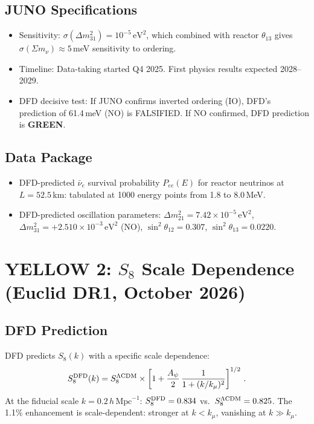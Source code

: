 \documentclass[11pt,a4paper]{article}
\newcommand{\GREEN}{\textcolor{dfdgreen}{\textbf{GREEN}}}
\begin{document}
\subsection{JUNO Specifications}
\begin{itemize}
\item Sensitivity: $\sigma(\Delta m^2_{31}) = 10^{-5}\,\mathrm{eV}^2$, which combined with reactor $\theta_{13}$ gives $\sigma(\Sigma m_\nu) \approx 5$\,meV sensitivity to ordering.
\item Timeline: Data-taking started Q4 2025. First physics results expected 2028--2029.
\item DFD decisive test: If JUNO confirms inverted ordering (IO), DFD's prediction of 61.4\,meV (NO) is FALSIFIED. If NO confirmed, DFD prediction is \GREEN.
\end{itemize}

\subsection{Data Package}
\begin{itemize}
\item DFD-predicted $\bar{\nu}_e$ survival probability $P_{ee}(E)$ for reactor neutrinos at $L = 52.5$\,km: tabulated at 1000 energy points from 1.8 to 8.0\,MeV.
\item DFD-predicted oscillation parameters: $\Delta m^2_{21} = 7.42 \times 10^{-5}\,\mathrm{eV}^2$, $\Delta m^2_{31} = +2.510 \times 10^{-3}\,\mathrm{eV}^2$ (NO), $\sin^2\theta_{12} = 0.307$, $\sin^2\theta_{13} = 0.0220$.
\end{itemize}

\section{YELLOW 2: $S_8$ Scale Dependence (Euclid DR1, October 2026)}

\subsection{DFD Prediction}
DFD predicts $S_8(k)$ with a specific scale dependence:
\begin{equation}
S_8^{\rm DFD}(k) = S_8^{\Lambda{\rm CDM}} \times \left[1 + \frac{A_\psi}{2}\,\frac{1}{1 + (k/k_\mu)^2}\right]^{1/2}\,.
\end{equation}
At the fiducial scale $k = 0.2\,h\,\mathrm{Mpc}^{-1}$: $S_8^{\rm DFD} = 0.834$ vs.\ $S_8^{\Lambda\rm CDM} = 0.825$. The 1.1\% enhancement is scale-dependent: stronger at $k < k_\mu$, vanishing at $k \gg k_\mu$.
\end{document}
